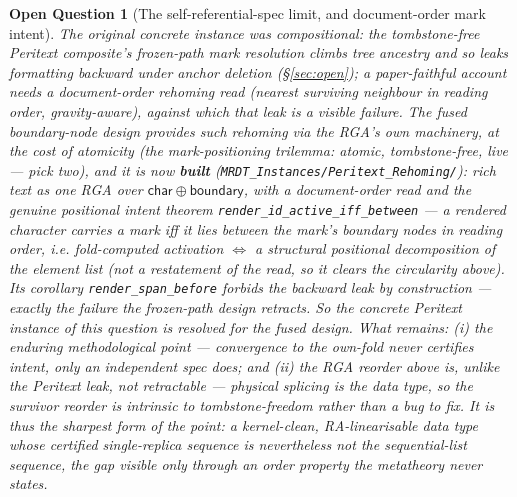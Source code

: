 \documentclass[11pt]{article}
\newtheorem{openq}[theorem]{Open Question}
\newcommand{\lean}[1]{\texttt{#1}}
\begin{document}
\begin{openq}[The self-referential-spec limit, and document-order mark intent]
The original concrete instance was compositional: the
tombstone-free Peritext composite's frozen-path mark resolution climbs tree
ancestry and so leaks formatting backward under anchor deletion
(\S\ref{sec:open}); a paper-faithful account needs a \emph{document-order}
rehoming read (nearest surviving neighbour in reading order, gravity-aware),
against which that leak is a visible failure. The fused boundary-node design
provides such rehoming via the RGA's own machinery, at the cost of atomicity
(the mark-positioning trilemma: atomic, tombstone-free, live --- pick two),
and it is now \textbf{built} (\lean{MRDT\_Instances/Peritext\_Rehoming/}): rich text
as one RGA over $\mathsf{char} \oplus \mathsf{boundary}$, with a document-order
read and the genuine positional intent theorem
\lean{render\_id\_active\_iff\_between} --- a rendered character carries a mark
iff it lies between the mark's boundary nodes in reading order, i.e.
fold-computed activation $\iff$ a structural positional decomposition of the
element list (\emph{not} a restatement of the read, so it clears the
circularity above). Its corollary \lean{render\_span\_before} forbids the
backward leak \emph{by construction} --- exactly the failure the frozen-path
design retracts. So the concrete Peritext instance of this question is
\emph{resolved} for the fused design. What remains: (i) the enduring
methodological point --- convergence to the own-fold never certifies intent,
only an independent spec does; and (ii) the RGA reorder above is, unlike the
Peritext leak, \emph{not} retractable --- physical splicing \emph{is} the
data type, so the survivor reorder is intrinsic to tombstone-freedom rather
than a bug to fix. It is thus the sharpest form of the point: a kernel-clean,
RA-linearisable data type whose certified single-replica sequence is
nevertheless not the sequential-list sequence, the gap visible only through
an order property the metatheory never states.


\end{openq}
\end{document}
